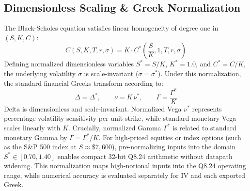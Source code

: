 \documentclass[sigconf,anonymous,review]{acmart}
\begin{document}
\subsection{Dimensionless Scaling \& Greek Normalization}
The Black-Scholes equation satisfies linear homogeneity of degree one in $(S, K, C)$:
\begin{equation}
    C(S, K, T, r, \sigma) = K \cdot C^*\left(\frac{S}{K}, 1, T, r, \sigma\right)
    \label{eq:homogeneity}
\end{equation}
Defining normalized dimensionless variables $S^* = S/K$, $K^* = 1.0$, and $C^* = C/K$, the underlying volatility $\sigma$ is scale-invariant ($\sigma = \sigma^*$). Under this normalization, the standard financial Greeks transform according to:
\begin{equation}
    \Delta = \Delta^*, \qquad \nu = K \, \nu^*, \qquad \Gamma = \frac{\Gamma^*}{K}
    \label{eq:greek_scaling}
\end{equation}
Delta is dimensionless and scale-invariant. Normalized Vega $\nu^*$ represents percentage volatility sensitivity per unit strike, while standard monetary Vega scales linearly with $K$. Crucially, normalized Gamma $\Gamma^*$ is related to standard monetary Gamma by $\Gamma = \Gamma^* / K$. For high-priced equities or index options (such as the S\&P 500 index at $S \approx \$7{,}600$), pre-normalizing inputs into the domain $S^* \in [0.70, 1.40]$ enables compact 32-bit Q8.24 arithmetic without datapath widening. This normalization maps high-notional inputs into the Q8.24 operating range, while numerical accuracy is evaluated separately for IV and each exported Greek.
\end{document}
